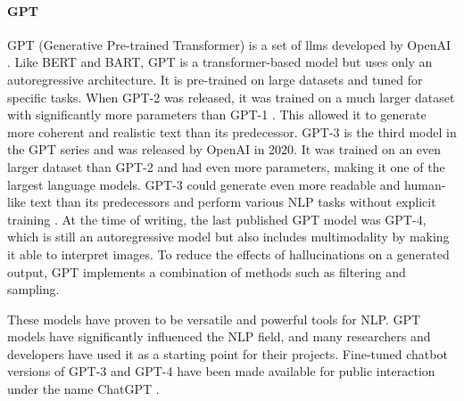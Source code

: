     \paragraph{GPT\\}
    GPT (Generative Pre-trained Transformer) is a set of \glspl{llm} developed by OpenAI \cite{radfordImprovingLanguageUnderstanding2018}. Like BERT and BART, GPT is a transformer-based model but uses only an autoregressive architecture. It is pre-trained on large datasets and tuned for specific tasks. When GPT-2 was released, it was trained on a much larger dataset with significantly more parameters than GPT-1 \cite{radfordLanguageModelsAre2019}. This allowed it to generate more coherent and realistic text than its predecessor. GPT-3 is the third model in the GPT series and was released by OpenAI in 2020. It was trained on an even larger dataset than GPT-2 and had even more parameters, making it one of the largest language models. GPT-3 could generate even more readable and human-like text than its predecessors and perform various NLP tasks without explicit training \cite{brownLanguageModelsAre2020}. At the time of writing, the last published GPT model was GPT-4, which is still an autoregressive model but also includes multimodality \cite{openaiGPT4TechnicalReport2023} by making it able to interpret images. To reduce the effects of hallucinations on a generated output, GPT implements a combination of methods such as filtering and sampling.
    
    These models have proven to be versatile and powerful tools for NLP. GPT models have significantly influenced the NLP field, and many researchers and developers have used it as a starting point for their projects. Fine-tuned chatbot versions of GPT-3 and GPT-4 have been made available for public interaction under the name ChatGPT \cite{ChatGPT}.

    
    
    
    
